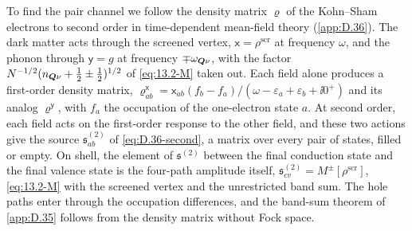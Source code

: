 To find the pair channel we follow the density matrix $\varrho$ of the Kohn--Sham electrons to second order in time-dependent mean-field theory (\cref{app:D.36}). The dark matter acts through the screened vertex, $\mathsf{x} = \rho^{\mathrm{scr}}$ at frequency $\omega$, and the phonon through $\mathsf{y} = g$ at frequency $\mp\omega_{\bm{Q}\nu}$, with the factor $N^{-1/2}(n_{\bm{Q}\nu} + \frac12 \pm \frac12)^{1/2}$ of \cref{eq:13.2-M} taken out. Each field alone produces a first-order density matrix, $\varrho^{\mathsf{x}}_{ab} = \mathsf{x}_{ab}(f_b - f_a)/(\omega - \varepsilon_a + \varepsilon_b + \ii0^+)$ and its analog $\varrho^{\mathsf{y}}$, with $f_a$ the occupation of the one-electron state $a$. At second order, each field acts on the first-order response to the other field, and these two actions give the source $\mathfrak{s}^{(2)}_{ab}$ of \cref{eq:D.36-second}, a matrix over every pair of states, filled or empty. On shell, the element of $\mathfrak{s}^{(2)}$ between the final conduction state and the final valence state is the four-path amplitude itself, $\mathfrak{s}^{(2)}_{cv} = M^\pm[\rho^{\mathrm{scr}}]$, \cref{eq:13.2-M} with the screened vertex and the unrestricted band sum. The hole paths enter through the occupation differences, and the band-sum theorem of \cref{app:D.35} follows from the density matrix without Fock space.

